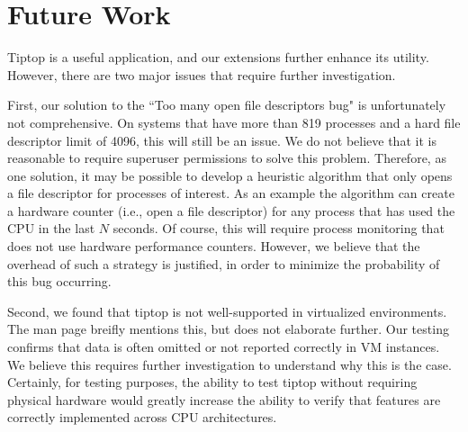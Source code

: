 \section{Future Work}
\label{sec:conclusion}
Tiptop is a useful application, and our extensions further enhance its utility.
However, there are two major issues that require further investigation.

First, our solution to the ``Too many open file descriptors bug" is unfortunately not comprehensive. On systems that have more than 819 processes and a hard file descriptor limit of 4096, this will still be an issue.
We do not believe that it is reasonable to require superuser permissions to solve this problem.
Therefore, as one solution, it may be possible to develop a heuristic algorithm that only opens a file descriptor for processes of interest.
As an example the algorithm can create a hardware counter (i.e., open a file descriptor) for any process that has used the CPU in the last $N$ seconds.
Of course, this will require process monitoring that does not use hardware performance counters.
However, we believe that the overhead of such a strategy is justified, in order to minimize the probability of this bug occurring.

Second, we found that tiptop is not well-supported in virtualized environments.
The man page breifly mentions this, but does not elaborate further.
Our testing confirms that data is often omitted or not reported correctly in VM instances.
We believe this requires further investigation to understand why this is the case.
Certainly, for testing purposes, the ability to test tiptop without requiring physical hardware would greatly increase the ability to verify that features are correctly implemented across CPU architectures.